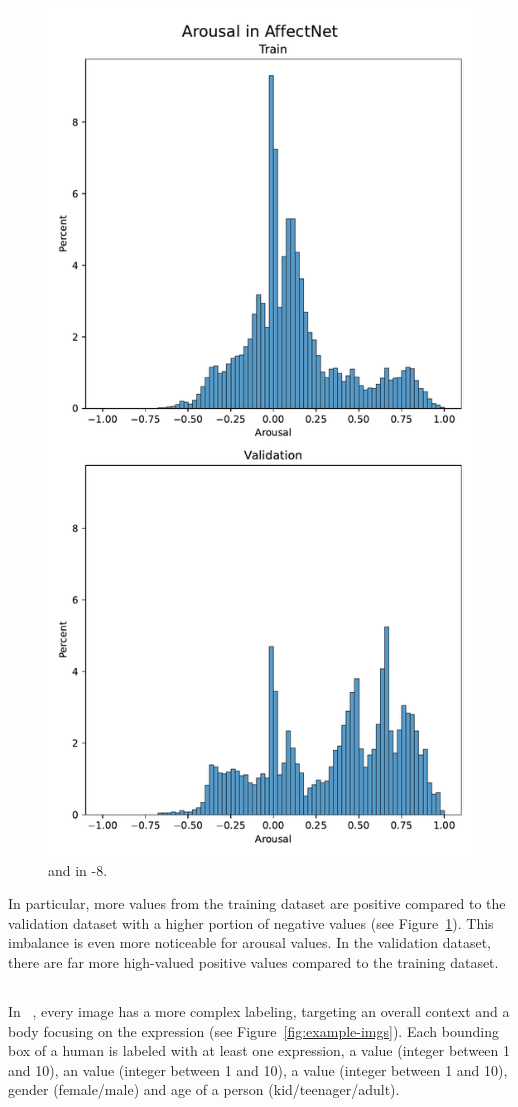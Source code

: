 \begin{figure}
    \includegraphics[width=0.65\columnwidth]{pictures/affectnet/arousal_distribution.pdf}
    \caption{\Val{} and \Aro{} in \affectnet{}-8.}
    \label{fig:valence_distribution}
\end{figure}
In particular, more values from the training dataset are positive compared to the validation dataset with a higher portion of negative values (see Figure~\ref{fig:valence_distribution}). This imbalance is even more noticeable for arousal values. In the validation dataset, there are far more high-valued positive values compared to the training dataset.

\subsection{\emotic{}}
In \emotic{}~\cite{kosti_emotic_2017},  every image has a more complex labeling, targeting an overall context and a body focusing on the expression (see Figure~\ref{fig:example-imgs}). Each bounding box of a human is labeled with at least one expression, a \val{} value (integer between 1 and 10), an \aro{} value (integer between 1 and 10), a \dom{} value (integer between 1 and 10), gender (female/male) and age of a person (kid/teenager/adult).

